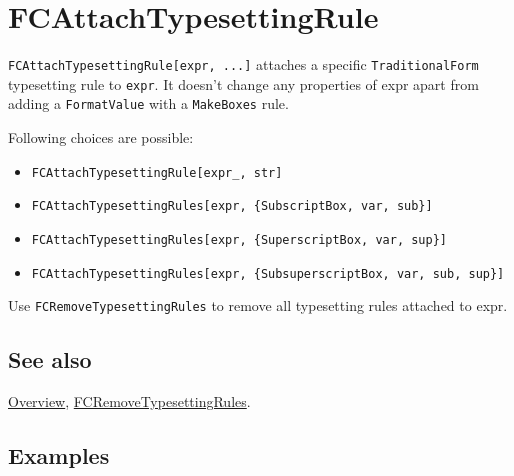 \documentclass[../FeynCalcManual.tex]{subfiles}
\begin{document}
\hypertarget{fcattachtypesettingrule}{%
\section{FCAttachTypesettingRule}\label{fcattachtypesettingrule}}

\texttt{FCAttachTypesettingRule[\allowbreak{}expr,\ \allowbreak{}...]}
attaches a specific \texttt{TraditionalForm} typesetting rule to
\texttt{expr}. It doesn't change any properties of expr apart from
adding a \texttt{FormatValue} with a \texttt{MakeBoxes} rule.

Following choices are possible:

\begin{itemize}
\item
  \texttt{FCAttachTypesettingRule[\allowbreak{}expr_,\ \allowbreak{}str]}
\item
  \texttt{FCAttachTypesettingRules[\allowbreak{}expr,\ \allowbreak{}\{\allowbreak{}SubscriptBox,\ \allowbreak{}var,\ \allowbreak{}sub\}]}
\item
  \texttt{FCAttachTypesettingRules[\allowbreak{}expr,\ \allowbreak{}\{\allowbreak{}SuperscriptBox,\ \allowbreak{}var,\ \allowbreak{}sup\}]}
\item
  \texttt{FCAttachTypesettingRules[\allowbreak{}expr,\ \allowbreak{}\{\allowbreak{}SubsuperscriptBox,\ \allowbreak{}var,\ \allowbreak{}sub,\ \allowbreak{}sup\}]}
\end{itemize}

Use \texttt{FCRemoveTypesettingRules} to remove all typesetting rules
attached to expr.

\subsection{See also}

\hyperlink{toc}{Overview},
\hyperlink{fcremovetypesettingrules}{FCRemoveTypesettingRules}.

\subsection{Examples}

\begin{Shaded}
\begin{Highlighting}[]
\OperatorTok{[}\OperatorTok{]}
\end{Highlighting}
\end{Shaded}

\begin{Shaded}
\begin{Highlighting}[]
\OperatorTok{[}\OperatorTok{,} \SpecialCharTok{\textbackslash{}[}\StringTok{Mu]"}\OperatorTok{]} 
 
\end{Highlighting}
\end{Shaded}
\end{document}
